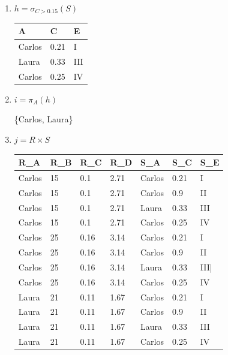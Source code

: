 \documentclass{article}
\begin{document}
\begin{enumerate}
\begin{enumerate}
        \item $h = \sigma_{C>0.15}(S)$
        
        \begin{tabular}{|l|l|l|}
        \hline
            A      & C    & E   \\ \hline
            Carlos & 0.21 & I   \\ \hline
            Laura  & 0.33 & III \\ \hline
            Carlos & 0.25 & IV  \\ \hline
        \end{tabular}
        
        \item $i=\pi_A(h)$
        
        \{Carlos, Laura\}
        
        \item $j = R \times S$
        
        \begin{tabular}{|l|l|l|l|l|l|l|}
        \hline
            R\_A   & R\_B & R\_C & R\_D & S\_A   & S\_C & S\_E \\ \hline
            Carlos & 15   & 0.1  & 2.71 & Carlos & 0.21 & I    \\ \hline
            Carlos & 15   & 0.1  & 2.71 & Carlos & 0.9  & II   \\ \hline
            Carlos & 15   & 0.1  & 2.71 & Laura  & 0.33 & III  \\ \hline
            Carlos & 15   & 0.1  & 2.71 & Carlos & 0.25 & IV   \\ \hline
            Carlos & 25   & 0.16 & 3.14 & Carlos & 0.21 & I    \\ \hline
            Carlos & 25   & 0.16 & 3.14 & Carlos & 0.9  & II   \\ \hline
            Carlos & 25   & 0.16 & 3.14 & Laura  & 0.33 & III| \\ \hline
            Carlos & 25   & 0.16 & 3.14 & Carlos & 0.25 & IV   \\ \hline
            Laura  & 21   & 0.11 & 1.67 & Carlos & 0.21 & I    \\ \hline
            Laura  & 21   & 0.11 & 1.67 & Carlos & 0.9  & II   \\ \hline
            Laura  & 21   & 0.11 & 1.67 & Laura  & 0.33 & III  \\ \hline
            Laura  & 21   & 0.11 & 1.67 & Carlos & 0.25 & IV   \\ \hline
        \end{tabular}
        
    \end{enumerate}
    
    
\end{enumerate}
\end{document}

